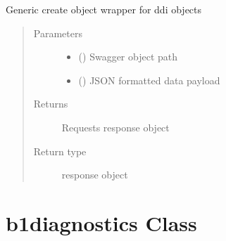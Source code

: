 \documentclass[letterpaper,10pt,english]{sphinxmanual}
\begin{document}
\begin{fulllineitems}
\begin{fulllineitems}
\label{\detokenize{b1ddi-class:bloxone.b1ddi.update}}
\sphinxAtStartPar
Generic create object wrapper for ddi objects
\begin{quote}\begin{description}
\item[{Parameters}] \leavevmode\begin{itemize}
\item {} 
\sphinxAtStartPar
{} () \textendash{} Swagger object path

\item {} 
\sphinxAtStartPar
{} () \textendash{} JSON formatted data payload

\end{itemize}

\item[{Returns}] \leavevmode
\sphinxAtStartPar
Requests response object

\item[{Return type}] \leavevmode
\sphinxAtStartPar
response object

\end{description}\end{quote}

\end{fulllineitems}


\end{fulllineitems}



\section{b1diagnostics Class}
\label{\detokenize{b1diagnostics-class:b1diagnostics-class}}\label{\detokenize{b1diagnostics-class::doc}}
\end{document}
